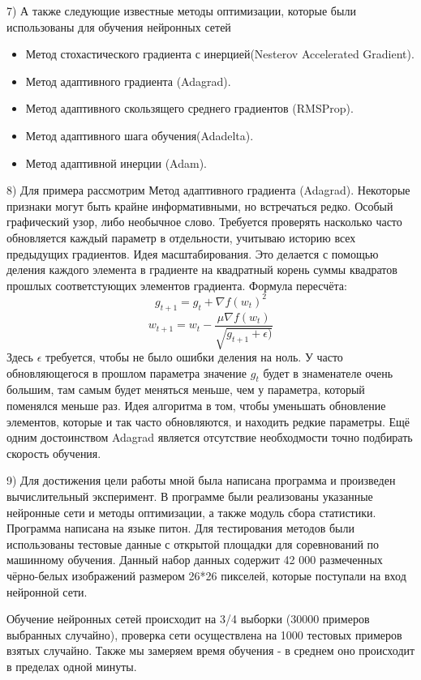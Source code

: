 7) А также следующие известные методы оптимизации, которые были использованы для обучения нейронных сетей
    \begin{itemize}
    \item Метод стохастического градиента с инерцией(Nesterov Accelerated Gradient).
    \item Метод адаптивного градиента (Adagrad).
    \item Метод адаптивного скользящего среднего градиентов (RMSProp).
    \item Метод адаптивного шага обучения(Adadelta).
    \item Метод адаптивной инерции (Adam).
    \end{itemize}
8)
Для примера рассмотрим
Метод адаптивного градиента (Adagrad).
Некоторые признаки могут быть крайне информативными, но встречаться редко. Особый графический узор, либо необычное слово. Требуется проверять насколько часто обновляется каждый параметр в отдельности, учитываю историю всех предыдущих градиентов. Идея масштабирования. Это делается с помощью деления каждого элемента в градиенте на квадратный корень суммы квадратов прошлых соответстующих элементов градиента. Формула пересчёта:
\[g_{t+1} = g_t + \nabla f(w_t)^2 \]
\[w_{t+1} = w_t - \frac{\mu \nabla f(w_t) }{\sqrt{g_{t+1} + \epsilon)} }  \]
Здесь \(\epsilon\) требуется, чтобы не было ошибки деления на ноль. У часто обновляющегося в прошлом параметра значение \(g_t \) будет в знаменателе очень большим, там самым будет меняться меньше, чем у параметра, который поменялся меньше раз. Идея алгоритма в том, чтобы уменьшать обновление элементов, которые и так часто обновляются, и находить редкие параметры. Ещё одним достоинством Adagrad  является отсутствие необходмости точно подбирать скорость обучения.

9) Для достижения цели работы мной была написана программа и произведен вычислительный эксперимент. В программе были реализованы указанные нейронные сети и методы оптимизации, а также модуль сбора статистики. Программа написана на языке питон. Для тестирования методов были использованы тестовые данные с открытой площадки для соревнований по машинному обучения. Данный набор данных содержит 42 000 размеченных чёрно-белых изображений размером 26*26 пикселей, которые поступали на вход нейронной сети.

Обучение нейронных сетей происходит на 3/4 выборки (30000 примеров выбранных случайно), проверка сети осуществлена на 1000 тестовых примеров взятых случайно. Также мы замеряем время обучения - в среднем оно происходит в пределах одной минуты.


